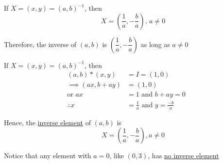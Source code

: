 \documentclass[14pt,fleqn]{extarticle}
\begin{document}
\begin{question}
\begin{step}
  \begin{options} 
     \correct 
       
     If $X = (x,y) = (a,b)^{-1}$, then 
     \[ \qquad X = \left(\frac{1}{a}, -\frac{b}{a} \right),\, a \neq 0\]
     
    Therefore, the inverse of $(a,b)$ is $\left(\dfrac{1}{a}, -\dfrac{b}{a} \right)$ as long as $a\neq 0$ 
    \end{options} 
     \reason 
      
      If $X = (x,y) = (a,b)^{-1}$, then 
      \begin{align}
      (a,b) * (x,y) &= I = (1,0) \\
	\implies \left(ax, b + ay \right) &= (1,0) \\
	\text{or } ax &= 1 \text{ and } b + ay = 0 \\[-10pt]
	\therefore x &= \frac{1}{a} \text{ and } y = \frac{-b}{a}
\end{align} 

Hence, the \underline{inverse element} of $(a,b)$ is  
\[\qquad X = \left(\dfrac{1}{a},-\dfrac{b}{a} \right), a \neq 0\]

Notice that any element with $a=0$, like $(0,3)$, has \underline{no inverse element}
\end{step}
\end{question} 
\end{document}
